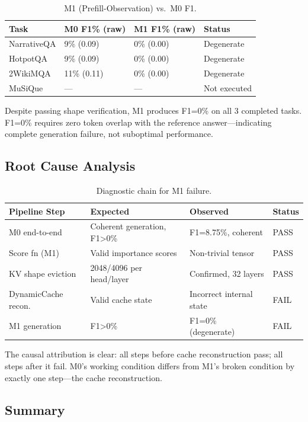 \begin{table}[h]
\centering
\caption{M1 (Prefill-Observation) vs.\ M0 F1.}
\label{tab:m1_vs_m0}
\begin{tabular}{llll}
\toprule
Task & M0 F1\% (raw) & M1 F1\% (raw) & Status \\
\midrule
NarrativeQA & 9\% (0.09) & 0\% (0.00) & Degenerate \\
HotpotQA    & 9\% (0.09) & 0\% (0.00) & Degenerate \\
2WikiMQA    & 11\% (0.11) & 0\% (0.00) & Degenerate \\
MuSiQue     & --- & --- & Not executed \\
\bottomrule
\end{tabular}
\end{table}

Despite passing shape verification, M1 produces F1=0\% on all 3 completed tasks. F1=0\% requires zero token overlap with the reference answer---indicating complete generation failure, not suboptimal performance.

\subsection{Root Cause Analysis}

\begin{table}[h]
\centering
\caption{Diagnostic chain for M1 failure.}
\label{tab:diagnosis}
\begin{tabular}{llll}
\toprule
Pipeline Step & Expected & Observed & Status \\
\midrule
M0 end-to-end & Coherent generation, F1>0\% & F1=8.75\%, coherent & PASS \\
Score fn (M1) & Valid importance scores & Non-trivial tensor & PASS \\
KV shape eviction & 2048/4096 per head/layer & Confirmed, 32 layers & PASS \\
DynamicCache recon. & Valid cache state & Incorrect internal state & FAIL \\
M1 generation & F1>0\% & F1=0\% (degenerate) & FAIL \\
\bottomrule
\end{tabular}
\end{table}

The causal attribution is clear: all steps before cache reconstruction pass; all steps after it fail. M0's working condition differs from M1's broken condition by exactly one step---the cache reconstruction.

\subsection{Summary}

